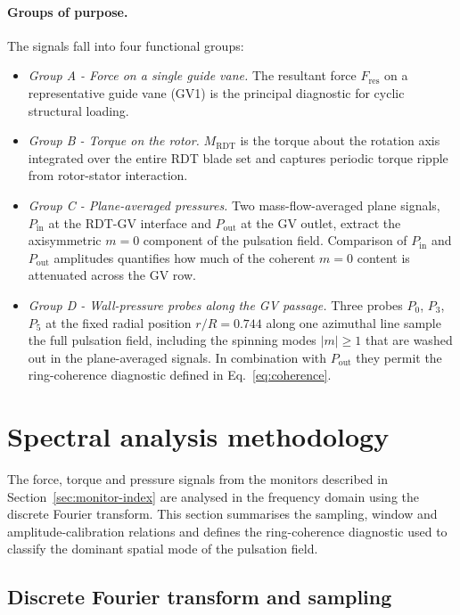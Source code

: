 \paragraph{Groups of purpose.}
The signals fall into four functional groups:
\begin{itemize}
  \item \emph{Group A - Force on a single guide vane.} The resultant force $F_{\mathrm{res}}$ on a representative guide vane (GV1) is the principal diagnostic for cyclic structural loading.
  \item \emph{Group B - Torque on the rotor.} $M_{\mathrm{RDT}}$ is the torque about the rotation axis integrated over the entire RDT blade set and captures periodic torque ripple from rotor-stator interaction.
  \item \emph{Group C - Plane-averaged pressures.} Two mass-flow-averaged plane signals, $P_{\mathrm{in}}$ at the RDT-GV interface and $P_{\mathrm{out}}$ at the GV outlet, extract the axisymmetric $m=0$ component of the pulsation field. Comparison of $P_{\mathrm{in}}$ and $P_{\mathrm{out}}$ amplitudes quantifies how much of the coherent $m=0$ content is attenuated across the GV row.
  \item \emph{Group D - Wall-pressure probes along the GV passage.} Three probes $P_0$, $P_3$, $P_5$ at the fixed radial position $r/R = 0.744$ along one azimuthal line sample the full pulsation field, including the spinning modes $|m|\geq 1$ that are washed out in the plane-averaged signals. In combination with $P_{\mathrm{out}}$ they permit the ring-coherence diagnostic defined in Eq.~\eqref{eq:coherence}.
\end{itemize}
 
\section{Spectral analysis methodology}
\label{sec:spec}
 
The force, torque and pressure signals from the monitors described in Section~\ref{sec:monitor-index} are analysed in the frequency domain using the discrete Fourier transform. This section summarises the sampling, window and amplitude-calibration relations and defines the ring-coherence diagnostic used to classify the dominant spatial mode of the pulsation field.
 
\subsection{Discrete Fourier transform and sampling}
\label{sec:spec-dft}
 
